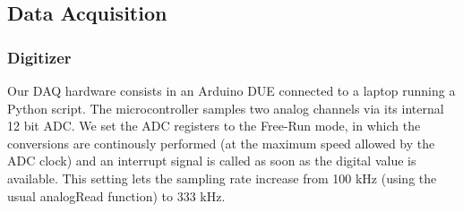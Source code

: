 \documentclass[12pt]{article}
\begin{document}
\subsection{Data Acquisition}
\subsubsection{Digitizer}
Our DAQ hardware consists in an Arduino DUE connected to a laptop running a Python script. The microcontroller samples two analog channels via its internal 12 bit ADC. We set the ADC registers to the Free-Run mode, in which the conversions are continously performed (at the maximum speed allowed by the ADC clock) and an interrupt signal is called as soon as the digital value is available. This setting lets the sampling rate increase from 100 kHz (using the usual analogRead function) to 333 kHz.
\end{document}
